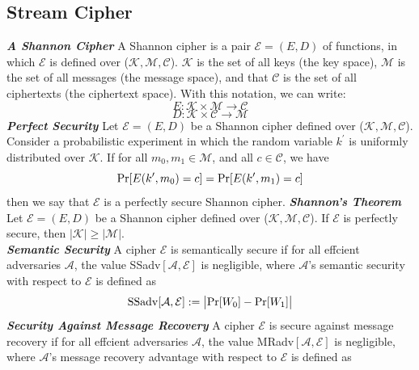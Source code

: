 \documentclass[a4paper,12pt,UTF8]{ctexart}
\begin{document}
\begin{spacing}{1.1}
\subsection{Stream Cipher}
\emph{\textbf{A Shannon Cipher}} A Shannon cipher is a pair $\mathcal{E} =(E,D)$ of functions, in which $\mathcal{E}$ is defined over ($\mathcal{K},\mathcal{M},\mathcal{C}$). $\mathcal{K}$ is the set of all keys (the key space), $\mathcal{M}$ is the set of all messages (the message space), and that $\mathcal{C}$ is the set of all ciphertexts (the ciphertext space). With this notation, we can write:
\begin{equation}
E:\mathcal{K}\times\mathcal{M}\rightarrow\mathcal{C}
\end{equation}
\begin{equation}
D:\mathcal{K}\times\mathcal{C}\rightarrow\mathcal{M}
\end{equation}
\indent\emph{\textbf{Perfect Security}} Let $\mathcal{E} =(E,D)$ be a Shannon cipher defined over ($\mathcal{K},\mathcal{M},\mathcal{C}$). Consider a probabilistic experiment in which the random variable $k^\prime$ is uniformly distributed over $\mathcal{K}$. If for all $m_0,m_1 \in{\mathcal{M}}$, and all $c\in{\mathcal{C}}$, we have
\begin{equation}
{\rm Pr}[E(k^\prime,m_0) = c] ={\rm Pr}[E(k^\prime,m_1) = c]
\end{equation}
then we say that $\mathcal{E}$ is a perfectly secure Shannon cipher. \vspace{3mm}
\newline\indent\emph{\textbf{Shannon's Theorem}} Let $\mathcal{E} =(E,D)$ be a Shannon cipher defined over ($\mathcal{K},\mathcal{M},\mathcal{C}$). If $\mathcal{E}$ is perfectly secure, then $|\mathcal{K}|\geq|\mathcal{M}|$. \vspace{3mm}
\\\indent\emph{\textbf{Semantic Security}} A cipher $\mathcal{E}$ is semantically secure if for all effcient adversaries $\mathcal{A}$, the value SSadv$[\mathcal{A},\mathcal{E}]$ is negligible, where $\mathcal{A}$'s semantic security with respect to $\mathcal{E}$ is defined as
\begin{equation}
{\rm SSadv}[\mathcal{A},\mathcal{E}]:=\big|{\rm Pr}[W_0] - {\rm Pr}[W_1]\big|
\end{equation}
\indent\emph{\textbf{Security Against Message Recovery}} A cipher $\mathcal{E}$ is secure against message recovery if for all effcient adversaries $\mathcal{A}$, the value MRadv$[\mathcal{A},\mathcal{E}]$ is negligible, where $\mathcal{A}$'s message recovery advantage with respect to $\mathcal{E}$ is defined as

\end{spacing}
\end{document}
